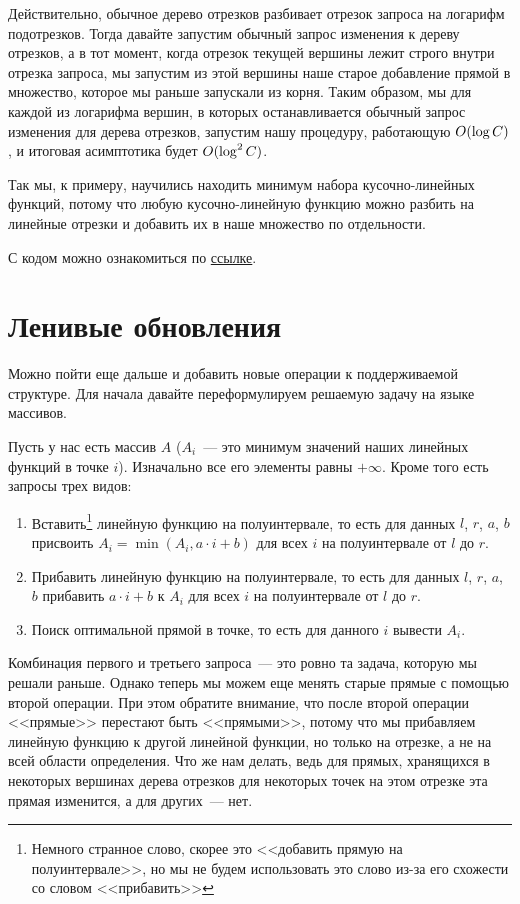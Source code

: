 Действительно, обычное дерево отрезков разбивает отрезок запроса на логарифм подотрезков. Тогда давайте запустим обычный запрос изменения к дереву отрезков, а в тот момент, когда отрезок текущей вершины лежит строго внутри отрезка запроса, мы запустим из этой вершины наше старое добавление прямой в множество, которое мы раньше запускали из корня. Таким образом, мы для каждой из логарифма вершин, в которых останавливается обычный запрос изменения для дерева отрезков, запустим нашу процедуру, работающую $O(\log C)$, и итоговая асимптотика будет $O(\log^2 C)$.

Так мы, к примеру, научились находить минимум набора кусочно-линейных функций, потому что любую кусочно-линейную функцию можно разбить на линейные отрезки и добавить их в наше множество по отдельности.

С кодом можно ознакомиться по \href{https://pastebin.com/64r3dazB}{ссылке}.

\section{Ленивые обновления}

Можно пойти еще дальше и добавить новые операции к поддерживаемой структуре. Для начала давайте переформулируем решаемую задачу на языке массивов.

Пусть у нас есть массив $A$ ($A_i$~--- это минимум значений наших линейных функций в точке $i$). Изначально все его элементы равны $+\infty$. Кроме того есть запросы трех видов:

\begin{enumerate}
    \item Вставить\footnote{Немного странное слово, скорее это <<добавить прямую на полуинтервале>>, но мы не будем использовать это слово из-за его схожести со словом <<прибавить>>} линейную функцию на полуинтервале, то есть для данных $l$, $r$, $a$, $b$ присвоить $A_i = \min(A_i, a \cdot i + b)$ для всех $i$ на полуинтервале от $l$ до $r$.

    \item Прибавить линейную функцию на полуинтервале, то есть для данных $l$, $r$, $a$, $b$ прибавить $a \cdot i + b$ к $A_i$ для всех $i$ на полуинтервале от $l$ до $r$.
    \item Поиск оптимальной прямой в точке, то есть для данного $i$ вывести $A_i$.
\end{enumerate}

Комбинация первого и третьего запроса~--- это ровно та задача, которую мы решали раньше. Однако теперь мы можем еще менять старые прямые с помощью второй операции. При этом обратите внимание, что после второй операции <<прямые>> перестают быть <<прямыми>>, потому что мы прибавляем линейную функцию к другой линейной функции, но только на отрезке, а не на всей области определения.
Что же нам делать, ведь для прямых, хранящихся в некоторых вершинах дерева отрезков для некоторых точек на этом отрезке эта прямая изменится, а для других~--- нет.

